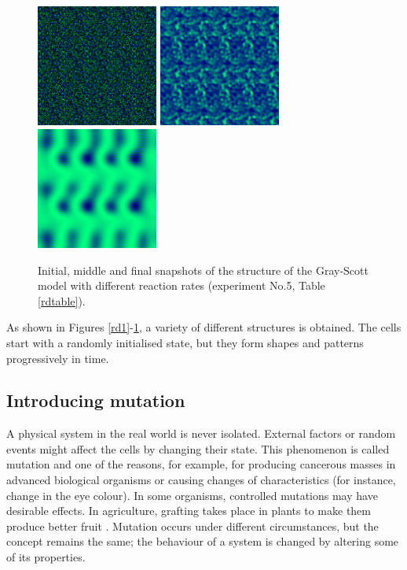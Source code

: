 \begin{figure}
\begin{center}
\includegraphics[width=4cm, height=4cm]{gs21.png}
\includegraphics[width=4cm, height=4cm]{gs22.png}
\includegraphics[width=4cm, height=4cm]{gs23.png}
\end{center}
\caption{Initial, middle and final snapshots of the structure of the Gray-Scott model with different reaction rates (experiment No.5, Table \ref{rdtable}).}
\label{gs2}
\end{figure}

As shown in Figures \ref{rd1}-\ref{gs2}, a variety of different structures is obtained. The cells start with a randomly initialised state, but they form shapes and patterns progressively in time.



\subsection{Introducing mutation}

A physical system in the real world is never isolated. External factors or random events might affect the cells by changing their state. This phenomenon is called mutation and one of the reasons, for example, for producing cancerous masses in advanced biological organisms or causing changes of characteristics (for instance, change in the eye colour). In some organisms, controlled mutations may have desirable effects. In agriculture, grafting takes place in plants to make them produce better fruit \cite{nelson_principles_2007}. Mutation occurs under different circumstances, but the concept remains the same; the behaviour of a system is changed by altering some of its properties.

